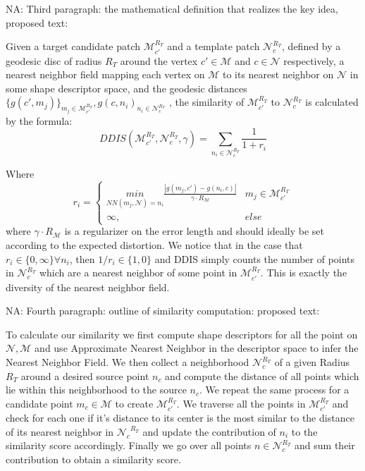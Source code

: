 \documentclass[10pt,twocolumn,letterpaper]{article}
\newcommand{\colornote}[3]{{\color{#1}\bf{#2: #3}\normalfont}}
\newcommand{\colornote}[3]{}
\newcommand {\nadav}[1]{\colornote{red}{NA}{#1}}
\begin{document}
\nadav{Third paragraph: the mathematical definition that realizes the key idea, proposed text:

Given a target candidate patch ${\mathcal{M}^{R_T}_{c'}}$ and a template patch ${\mathcal{N}^{R_T}_{c}}$, defined by a geodesic disc of radius $R_T$ around  the vertex $c'\in\mathcal{M}$ and $c\in\mathcal{N}$ respectively, a nearest neighbor field mapping each vertex on $\mathcal{M}$ to its nearest neighbor on $\mathcal{N}$ in some shape descriptor space, and the geodesic distances $\{g(c',m_j)\}_{m_j\in\mathcal{M}^{R_T}_{c'}},g(c,n_i)_{n_i\in\mathcal{N}^{R_T}_{c}}$ , the similarity of ${\mathcal{M}^{R_T}_{c'}}$ to ${\mathcal{N}^{R_T}_{c}}$ is calculated by the formula:
\begin{equation}
DDIS({\mathcal{M}^{R_T}_{c'},{\mathcal{N}^{R_T}_{c}}},\gamma)=\sum_{n_i\in {\mathcal{N}^{R_T}_{c}}}\frac{1}{1+r_i}
\end{equation}

Where 
\begin{equation}
r_i = 
\begin{cases}
\underset{NN(m_j,\mathcal{N})=n_i}{min}\frac{|g(m_j,c')-g(n_i,c)|}{\gamma\cdot R_\mathcal{M}} & m_j\in\mathcal{M}^{R_T}_{c'}\\
          \infty,&              else
\end{cases}
\end{equation}
where $\gamma\cdot R_\mathcal{M}$ is a regularizer on the error length and should ideally be set according to the expected distortion. 
We notice that in the case that $r_i\in\{0,\infty\}\forall n_i$, then $1/r_i\in\{1,0\}$ and DDIS simply counts the number of points in ${\mathcal{N}^{R_T}_{c}}$ which are a nearest neighbor of some point in ${\mathcal{M}^{R_T}_{c'}}$. This is exactly the diversity of the nearest neighbor field.} 

\nadav{Fourth paragraph: outline of similarity computation: proposed text: 

To calculate our similarity we first compute shape descriptors for all the point on $\mathcal{N},\mathcal{M}$ and use Approximate Nearest Neighbor in the descriptor space to infer the Nearest Neighbor Field.
We then collect a neighborhood $\mathcal{N}^{R_T}_{c}$ of a given Radius $R_T$ around a desired source point $n_c$ and compute the distance of all points which lie within this neighborhood to the source $n_c$.
We repeat the same process for a candidate point $m_c\in\mathcal{M}$ to create ${\mathcal{M}^{R_T}_{c'}}$.
We traverse all the points in ${\mathcal{M}^{R_T}_{c'}}$ and check for each one if it's distance to its center is the most similar to the distance of its nearest neighbor in ${\mathcal{N}_c}^{R_T}$ and update the contribution of $n_i$ to the similarity score accordingly.
Finally we go over all points $n\in\mathcal{N}^{R_T}_{c}$ and sum their contribution to obtain a similarity score.
}
\end{document}
